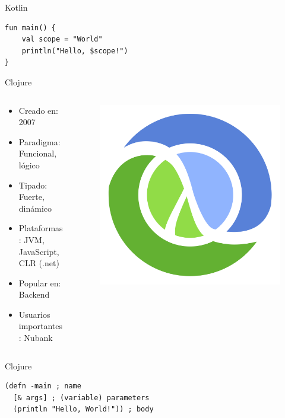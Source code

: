\documentclass[aspectratio=169]{beamer}
\begin{document}
\begin{frame}[fragile]{Kotlin}
\begin{lstlisting}
fun main() {
    val scope = "World"
    println("Hello, $scope!")
}
\end{lstlisting}
\end{frame}



\begin{frame}{Clojure}
	\begin{columns}[T] %
		\begin{column}[T]{0.5\textwidth} %
			\begin{itemize}
				\item Creado en: 2007
				\item Paradigma: Funcional, lógico
				\item Tipado: Fuerte, dinámico
				\item Plataformas: JVM, JavaScript, CLR (.net)
				\item Popular en: Backend
				\item Usuarios importantes: Nubank
			\end{itemize}
		\end{column}
		\begin{column}[T]{7cm} %
			\begin{figure}
				\centering
				\includegraphics[width=0.5\linewidth]{Images/clojure}
			\end{figure}
			
		\end{column}
	\end{columns}
\end{frame}

\begin{frame}[fragile]{Clojure}
\begin{lstlisting}
(defn -main ; name
  [& args] ; (variable) parameters
  (println "Hello, World!")) ; body
\end{lstlisting}
\end{frame}
\end{document}
